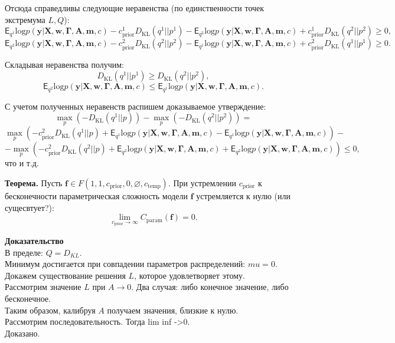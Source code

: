 \documentclass[12pt]{article}
\begin{document}
 Отсюда справедливы следующие неравенства (по единственности точек экстремума $L,Q$):
\[
    \mathsf{E}_{q^1}\text{log} p(\mathbf{y}|\mathbf{X},\mathbf{w}, \boldsymbol{\Gamma}, \mathbf{A},\mathbf{m}, c) - c_{\text{prior}}^1  D_\text{KL}(q^1||p^1)  -  \mathsf{E}_{q^2}\text{log} p(\mathbf{y}|\mathbf{X},\mathbf{w}, \boldsymbol{\Gamma}, \mathbf{A},\mathbf{m}, c) + c_{\text{prior}}^1  D_\text{KL}(q^2||p^2) \geq 0,
\]
\[
    \mathsf{E}_{q^2}\text{log} p(\mathbf{y}|\mathbf{X},\mathbf{w}, \boldsymbol{\Gamma}, \mathbf{A},\mathbf{m}, c) - c_{\text{prior}}^2  D_\text{KL}(q^2||p^2)  -  \mathsf{E}_{q^1}\text{log} p(\mathbf{y}|\mathbf{X},\mathbf{w}, \boldsymbol{\Gamma}, \mathbf{A},\mathbf{m}, c) + c_{\text{prior}}^2  D_\text{KL}(q^1||p^1) \geq 0.
\]

Складывая неравенства получим:
\[
    D_\text{KL}(q^1||p^1) \geq D_\text{KL}(q^2||p^2),
\]
\[
    \mathsf{E}_{q^2}\text{log} p(\mathbf{y}|\mathbf{X},\mathbf{w}, \boldsymbol{\Gamma}, \mathbf{A},\mathbf{m}, c)  \leq \mathsf{E}_{q^1}\text{log} p(\mathbf{y}|\mathbf{X},\mathbf{w}, \boldsymbol{\Gamma}, \mathbf{A},\mathbf{m}, c) .
\]

С учетом полученных неравенств распишем доказываемое утверждение:
\[
    \max_p \left(-D_\text{KL}(q^1||p)\right) - \max_{p} \left(-D_\text{KL}(q^2||p^2)\right) = 
\]
\[ \max_p  \left(-c_{\text{prior}}^2 D_\text{KL}(q^1||p) +\mathsf{E}_{q^1}\text{log} p(\mathbf{y}|\mathbf{X},\mathbf{w}, \boldsymbol{\Gamma}, \mathbf{A},\mathbf{m}, c) - \mathsf{E}_{q^1}\text{log} p(\mathbf{y}|\mathbf{X},\mathbf{w}, \boldsymbol{\Gamma}, \mathbf{A},\mathbf{m}, c) \right) -
\]
\[  - \max_{p} \left(-c_{\text{prior}}^2 D_\text{KL}(q^2||p)  + \mathsf{E}_{q^2}\text{log} p(\mathbf{y}|\mathbf{X},\mathbf{w}, \boldsymbol{\Gamma}, \mathbf{A},\mathbf{m}, c) +\mathsf{E}_{q^2}\text{log} p(\mathbf{y}|\mathbf{X},\mathbf{w}, \boldsymbol{\Gamma}, \mathbf{A},\mathbf{m}, c)  \right)    \leq 0,  
\]
что и т.д.
\clearpage

\textbf{Теорема.}
Пусть $\mathbf{f} \in F(1, 1, c_{\text{prior}}, 0, \varnothing,  c_{\text{temp}} )$.
При устремлении $ c_{\text{prior}}$ к бесконечности параметрическая сложность модели $\mathbf{f}$ устремляется к нулю (или сущесвтует?):
\[
    \lim_{c_{\text{prior}} \to \infty} C_{\text{param}}(\mathbf{f}) = 0.
\]

\textbf{Доказательство}\\
В пределе: $Q = D_{KL}.$\\
Минимум достигается при совпадении параметров распределений: $mu = 0$.\\
Докажем существование решения $L$, которое удовлетворяет этому.\\
Рассмотрим значение $L$ при $A \to 0$. Два случая: либо конечное значение, либо бесконечное.\\
Таким образом, калибруя $A$ получаем значения, близкие к нулю. \\
Рассмотрим последовательность. Тогда lim inf ->0.\\
Доказано. 
\end{document}
